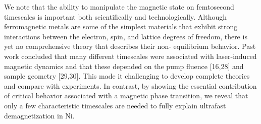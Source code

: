 We note that the ability to manipulate the magnetic state on femtosecond timescales is important both scientifically and technologically. Although ferromagnetic metals are some of the simplest materials that exhibit strong interactions between the electron, spin, and lattice degrees of freedom, there is yet no comprehensive theory that describes their non- equilibrium behavior. Past work concluded that many different timescales were associated with laser-induced magnetic dynamics and that these depended on the pump fluence [16,28] and sample geometry [29,30]. This made it challenging to develop complete theories and compare with experiments. In contrast, by showing the essential contribution of critical behavior associated with a magnetic phase transition, we reveal that only a few characteristic timescales are needed to fully explain ultrafast demagnetization in Ni.


